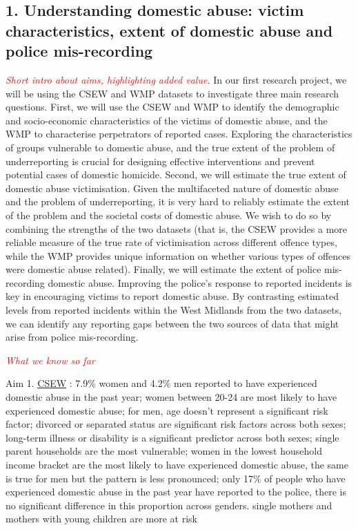 \documentclass[11pt, a4paper]{article}
\begin{document}
\subsection*{1. Understanding domestic abuse: victim characteristics, extent of domestic abuse and police mis-recording}

 \textcolor{red}{\textit{Short intro about aims, highlighting added value.}}
In our first research project, we will be using the CSEW and WMP datasets to investigate three main research questions. First, we will use the CSEW and WMP to identify the demographic and socio-economic characteristics of the victims of domestic abuse, and the WMP to characterise perpetrators of reported cases. Exploring the characteristics of groups vulnerable to domestic abuse, and the true extent of the problem of underreporting is crucial for designing effective interventions and prevent potential cases of domestic homicide. Second, we will estimate the true extent of domestic abuse victimisation. Given the multifaceted nature of domestic abuse and the problem of underreporting, it is very hard to reliably estimate the extent of the problem and the societal costs of domestic abuse. We wish to do so by combining the strengths of the two datasets (that is, the CSEW provides a more reliable measure of the true rate of victimisation across different offence types, while the WMP provides unique information on whether various types of offences were domestic abuse related). Finally, we will estimate the extent of police mis-recording domestic abuse. Improving the police's response to reported incidents is key in encouraging victims to report domestic abuse. By contrasting estimated levels from reported incidents within the West Midlands from the two datasets, we can identify any reporting gaps between the two sources of data that might arise from police mis-recording.

\textcolor{red}{\textit{What we know so far}} 

Aim 1. \href{https://www.ons.gov.uk/peoplepopulationandcommunity/crimeandjustice/articles/domesticabusefindingsfromthecrimesurveyforenglandandwales/yearendingmarch2018}{CSEW} : 7.9\% women and 4.2\% men reported to have experienced domestic abuse in the past year; women between 20-24 are most likely to have experienced domestic abuse; for men, age doesn't represent a significant risk factor;  divorced or separated status are significant risk factors across both sexes; long-term illness or disability is a significant predictor across both sexes; single parent households are the most vulnerable; women in the lowest household income bracket are the most likely to have experienced domestic abuse, the same is true for men but the pattern is less pronounced; only 17\% of people who have experienced domestic abuse in the past year have reported to the police, there is no significant difference in this proportion across genders.   
single mothers and mothers with young children are more at risk
\end{document}
